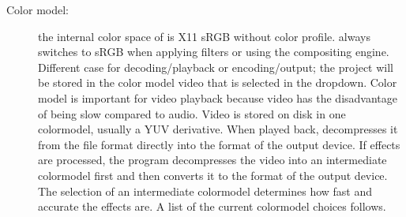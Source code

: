 \begin{description}
    \item[Color model:]
        the internal color space of \CGG{} is X11 sRGB without color profile. \CGG{} always switches to sRGB when applying filters or using the compositing engine. Different case for decoding/playback or encoding/output; the project will be stored in the color model video that is selected in the dropdown.  
        Color model is important for video playback because video has the disadvantage of being slow compared to audio.  
        Video is stored on disk in one colormodel, usually a YUV derivative. 
        When played back, \CGG{} decompresses it from the file format directly into the format of the output device. 
        If effects are processed, the program decompresses the video into an intermediate colormodel first and then converts it to the format of the output device. 
        The selection of an intermediate colormodel determines how fast and accurate the effects are.  
        A list of the current colormodel choices follows.


\end{description}

